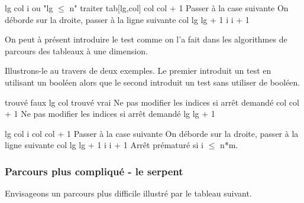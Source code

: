 \begin{Pseudocode}
	\Let lg 
	\Let col 
	\Let i 
	 \RComment ou "lg $\le$ n" 
		\Stmt traiter tab[lg,col]
		\Let col \Gets col + 1	\RComment Passer à la case suivante
		 \RComment On déborde sur la droite, passer à la ligne suivante
			\Let col 
			\Let lg \Gets lg + 1
		\EndIf
		\Let i \Gets i + 1		
	\EndWhile
\end{Pseudocode}

On peut à présent introduire le test comme on l'a fait 
dans les algorithmes de parcours des tableaux à une dimension.

Illustrons-le au travers de deux exemples.
Le premier introduit un test en utilisant un booléen
alors que le second introduit un test
sans utiliser de booléen.

\begin{Pseudocode}
	\Let trouvé \Gets faux
	\Let lg 
		\Let col 
				\Let trouvé \Gets vrai
			\Else \RComment Ne pas modifier les indices si arrêt demandé
				\Let col \Gets col + 1
			\EndIf
		\EndWhile
		 \RComment Ne pas modifier les indices si arrêt demandé
			\Let lg \Gets lg + 1
		\EndIf
	\EndWhile
\end{Pseudocode}

\begin{Pseudocode}
	\Let lg 
	\Let col 
	\Let i 
		\Let col \Gets col + 1	\RComment Passer à la case suivante
		 \RComment On déborde sur la droite, passer à la ligne suivante
			\Let col 
			\Let lg \Gets lg + 1
		\EndIf
		\Let i \Gets i + 1		
	\EndWhile
	\LComment Arrêt prématuré si i $\le$ n*m.
\end{Pseudocode}

\subsubsection*{Parcours plus compliqué - le serpent}

Envisageons un parcours plus difficile illustré par le tableau suivant.

